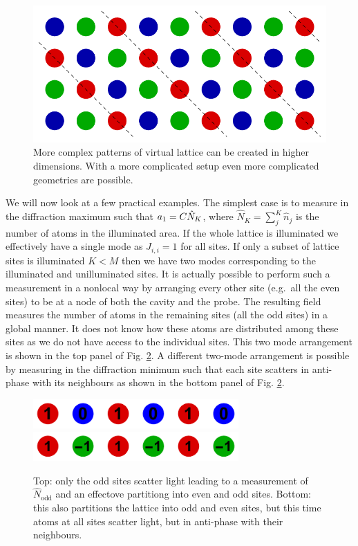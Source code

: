 \begin{figure}[htbp!]
  \centering
  \includegraphics[width=1.0\textwidth]{2DModes}
  \caption[2D Modes due to Measurement Backaction]{ More complex
    patterns of virtual lattice can be created in higher
    dimensions. With a more complicated setup even more complicated
    geometries are possible.}
  \label{fig:2dmodes}
\end{figure}

We will now look at a few practical examples.  The simplest case is to
measure in the diffraction maximum such that $a_1 = C \hat{N}_K$,
where $\hat{N}_K = \sum_j^K \hat{n}_j$ is the number of atoms in the
illuminated area. If the whole lattice is illuminated we effectively
have a single mode as $J_{i,i} = 1$ for all sites. If only a subset of
lattice sites is illuminated $K < M$ then we have two modes
corresponding to the illuminated and unilluminated sites. It is
actually possible to perform such a measurement in a nonlocal way by
arranging every other site (e.g.~all the even sites) to be at a node
of both the cavity and the probe. The resulting field measures the
number of atoms in the remaining sites (all the odd sites) in a global
manner. It does not know how these atoms are distributed among these
sites as we do not have access to the individual sites. This two mode
arrangement is shown in the top panel of Fig. \ref{fig:twomodes}. A
different two-mode arrangement is possible by measuring in the
diffraction minimum such that each site scatters in anti-phase with
its neighbours as shown in the bottom panel of
Fig. \ref{fig:twomodes}. 

\begin{figure}[htbp!]
  \centering
  \includegraphics[width=0.7\textwidth]{TwoModes1}
  \includegraphics[width=0.7\textwidth]{TwoModes2}
  \caption[Two Mode Partitioning]{Top: only the odd sites scatter
    light leading to a measurement of $\hat{N}_\mathrm{odd}$ and an
    effectove partitiong into even and odd sites. Bottom: this also
    partitions the lattice into odd and even sites, but this time
    atoms at all sites scatter light, but in anti-phase with their
    neighbours.}
  \label{fig:twomodes}
\end{figure}

